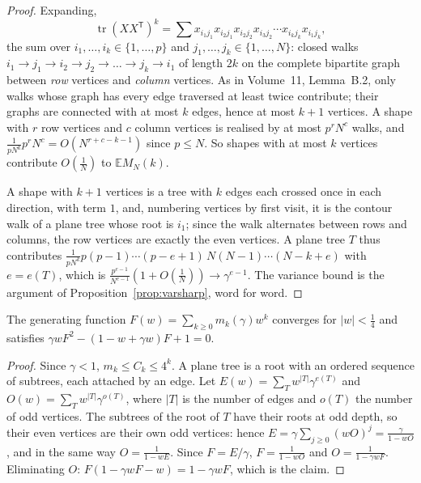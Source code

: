 \begin{proof}
Expanding,
\[
\operatorname{tr}(XX^{\mathsf T})^k=\sum x_{i_1j_1}x_{i_2j_1}x_{i_2j_2}x_{i_3j_2}\cdots x_{i_kj_k}x_{i_1j_k},
\]
the sum over $i_1,\dots,i_k\in\{1,\dots,p\}$ and $j_1,\dots,j_k\in\{1,\dots,N\}$: closed walks $i_1\to j_1\to i_2\to j_2\to\dots\to j_k\to i_1$ of length $2k$ on the complete bipartite graph between \emph{row} vertices and \emph{column}
vertices. As in Volume~11, Lemma~B.2, only walks whose graph has every edge traversed at least twice contribute; their graphs are connected with at most $k$ edges, hence at most $k+1$ vertices. A shape with $r$ row
vertices and $c$ column vertices is realised by at most $p^rN^c$ walks, and $\frac1{pN^k}p^rN^c=O(N^{r+c-k-1})$ since $p\le N$. So shapes with at most $k$ vertices contribute $O(\frac1N)$ to $\mathbb EM_N(k)$.

A shape with $k+1$ vertices is a tree with $k$ edges each crossed once in each direction, with term $1$, and, numbering vertices by first visit, it is the contour walk of a plane tree whose root is $i_1$; since the walk
alternates between rows and columns, the row vertices are exactly the even vertices. A plane tree $T$ thus contributes $\frac{1}{pN^k}p(p-1)\cdots(p-e+1)\,N(N-1)\cdots(N-k+e)$ with $e=e(T)$, which is
$\frac{p^{e-1}}{N^{e-1}}(1+O(\frac1N))\to\gamma^{e-1}$. The variance bound is the argument of Proposition~\ref{prop:varsharp}, word for word.
\end{proof}

\begin{lemma}\label{lem:mpgf}
The generating function $F(w)=\sum_{k\ge0}m_k(\gamma)w^k$ converges for $|w|<\frac14$ and satisfies $\gamma wF^2-(1-w+\gamma w)F+1=0$.
\end{lemma}

\begin{proof}
Since $\gamma<1$, $m_k\le C_k\le4^k$. A plane tree is a root with an ordered sequence of subtrees, each attached by an edge. Let $E(w)=\sum_Tw^{|T|}\gamma^{e(T)}$ and $O(w)=\sum_Tw^{|T|}\gamma^{o(T)}$, where $|T|$ is the number of edges and
$o(T)$ the number of odd vertices. The subtrees of the root of $T$ have their roots at odd depth, so their even vertices are their own odd vertices: hence $E=\gamma\sum_{j\ge0}(wO)^j=\frac\gamma{1-wO}$, and in the same way
$O=\frac1{1-wE}$. Since $F=E/\gamma$, $F=\frac1{1-wO}$ and $O=\frac1{1-\gamma wF}$. Eliminating $O$: $F(1-\gamma wF-w)=1-\gamma wF$, which is the claim.
\end{proof}

